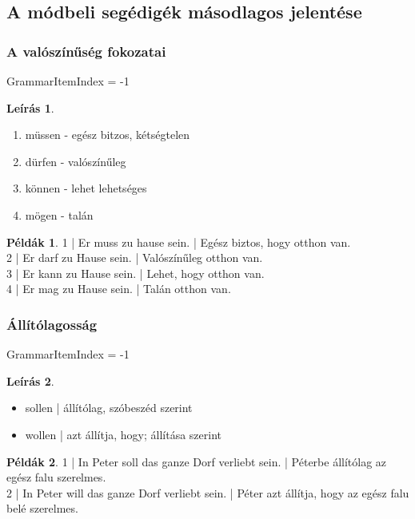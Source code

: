 \documentclass{article}
\theoremstyle{definition}
\newtheorem*{exmp}{Példák}
\newtheorem*{desc}{Leírás}
\begin{document}
\subsection{A módbeli segédigék másodlagos jelentése}

\subsubsection{A valószínűség fokozatai}

GrammarItemIndex = -1

\begin{desc}
\begin{enumerate}
\item müssen - egész bitzos, kétségtelen
\item dürfen - valószínűleg
\item können - lehet lehetséges
\item mögen - talán
\end{enumerate}
\end{desc}

\begin{exmp}
1 | Er muss zu hause sein. | Egész biztos, hogy otthon van.\\
2 | Er darf zu Hause sein. | Valószínűleg otthon van.\\
3 | Er kann zu Hause sein. | Lehet, hogy otthon van.\\
4 | Er mag zu Hause sein. | Talán otthon van.\\
\end{exmp}

\subsubsection{Állítólagosság}

GrammarItemIndex = -1

\begin{desc}
\begin{itemize}
\item sollen | állítólag, szóbeszéd szerint
\item wollen | azt állítja, hogy; állítása szerint
\end{itemize}
\end{desc}

\begin{exmp}
1 | In Peter soll das ganze Dorf verliebt sein. | Péterbe állítólag az egész falu szerelmes.\\
2 | In Peter will das ganze Dorf verliebt sein. | Péter azt állítja, hogy az egész falu belé szerelmes.\\
\end{exmp}
\end{document}
